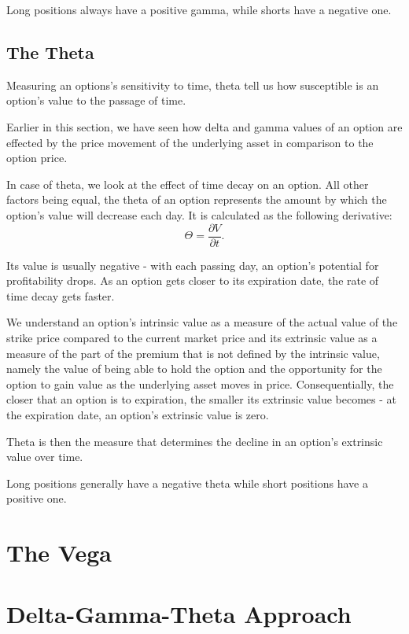 \documentclass[a4paper, 12pt]{article}
\theoremstyle{definition}
\theoremstyle{plain}
\begin{document}
Long positions always have a positive gamma, while 
shorts have a negative one.
 


\subsection{The Theta}

Measuring an options's sensitivity to time, 
theta tell us how susceptible is an option's value 
to the passage of time. 

Earlier in this section, we have seen how delta and gamma
values of an option are effected by the price movement 
of the underlying asset in comparison to the option price.

In case of theta, we look at the effect of time decay 
on an option. All other factors being equal, the theta of 
an option represents the amount by which the option's value 
will decrease each day. It is calculated as the following 
derivative:
$$
\Theta = \frac{\partial V}{\partial t}.
$$

Its value is usually negative - with each passing day, 
an option's potential for profitability drops.
As an option gets closer to its expiration date, 
the rate of time decay gets faster.

We understand an option's intrinsic value as a measure 
of the actual value of the strike price compared to the 
current market price and its extrinsic value as a measure 
of the part of the premium that is not defined by 
the intrinsic value, namely the value of being able to 
hold the option and the opportunity for the option to gain 
value as the underlying asset moves in price. Consequentially,
the closer that an option is to expiration, the smaller 
its extrinsic value becomes - at the expiration date, 
an option's extrinsic value is zero.

Theta is then the measure that determines the decline in 
an option's extrinsic value over time.

Long positions generally have a negative theta while 
short positions have a positive one. 


\section{The Vega}


\section{Delta-Gamma-Theta Approach}
\end{document}
